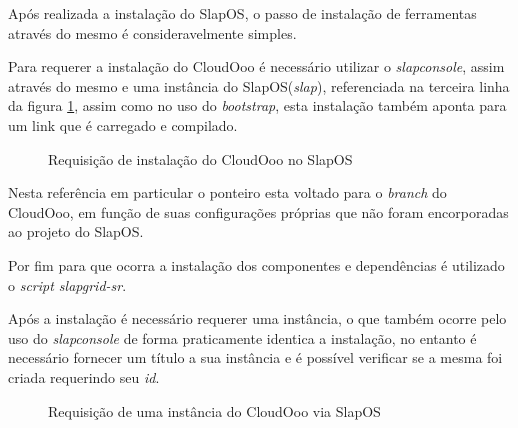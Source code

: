 Após realizada a instalação do SlapOS, o passo de instalação de ferramentas através do mesmo é consideravelmente simples.

Para requerer a instalação do CloudOoo é necessário utilizar o \textit{slapconsole}, assim através do mesmo e uma instância do SlapOS(\textit{slap}), referenciada na terceira linha da figura \ref{requisicao-software}, assim como no uso do \textit{bootstrap}, esta instalação também aponta para um link que é carregado e compilado.

\begin{figure}[ht]
    \centering
    \caption{Requisição de instalação do CloudOoo no SlapOS}
    \label{requisicao-software}
\end{figure}

Nesta referência em particular o ponteiro esta voltado para o \textit{branch} do CloudOoo, em função de suas configurações próprias que não foram encorporadas ao projeto do SlapOS.

Por fim para que ocorra a instalação dos componentes e dependências é utilizado o \textit{script slapgrid-sr}.

Após a instalação é necessário requerer uma instância, o que também ocorre pelo uso do \textit{slapconsole} de forma praticamente identica a instalação, no entanto é necessário fornecer um título a sua instância e é possível verificar se a mesma foi criada requerindo seu \textit{id}.

\begin{figure}[ht]
    \centering
    \caption{Requisição de uma instância do CloudOoo via SlapOS}
    \label{requisicao-instancia}
\end{figure}

